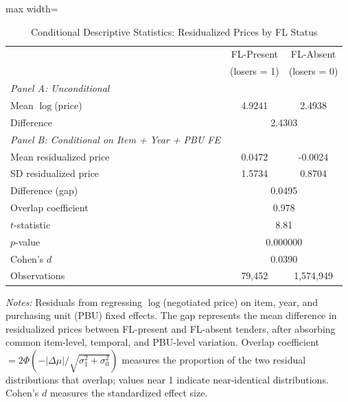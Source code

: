 \begin{table}[htbp]
\centering
\caption{Conditional Descriptive Statistics: Residualized Prices by FL Status}
\label{tab:conditional_descstats}
\begin{adjustbox}{max width=\textwidth}
\begin{threeparttable}
\small
\begin{tabular}{lcc}
\toprule
 & FL-Present & FL-Absent \\
 & (losers = 1) & (losers = 0) \\
\midrule
\textit{Panel A: Unconditional} & & \\
Mean $\log$(price) & 4.9241 & 2.4938 \\
Difference & \multicolumn{2}{c}{2.4303} \\
\midrule
\textit{Panel B: Conditional on Item + Year + PBU FE} & & \\
Mean residualized price & 0.0472 & -0.0024 \\
SD residualized price & 1.5734 & 0.8704 \\
Difference (gap) & \multicolumn{2}{c}{0.0495} \\
Overlap coefficient & \multicolumn{2}{c}{0.978} \\
$t$-statistic & \multicolumn{2}{c}{8.81} \\
$p$-value & \multicolumn{2}{c}{0.000000} \\
Cohen's $d$ & \multicolumn{2}{c}{0.0390} \\
\midrule
Observations & 79,452 & 1,574,949 \\
\bottomrule
\end{tabular}
\begin{tablenotes}
\small
\item \textit{Notes:} Residuals from regressing $\log$(negotiated price) on item,
year, and purchasing unit (PBU) fixed effects. The gap represents the mean
difference in residualized prices between FL-present and FL-absent tenders,
after absorbing common item-level, temporal, and PBU-level variation.
Overlap coefficient $= 2\Phi(-|\Delta\mu|/\sqrt{\sigma_1^2 + \sigma_0^2})$
measures the proportion of the two residual distributions that overlap;
values near 1 indicate near-identical distributions.
Cohen's $d$ measures the standardized effect size.
\end{tablenotes}
\end{threeparttable}
\end{adjustbox}
\end{table}

